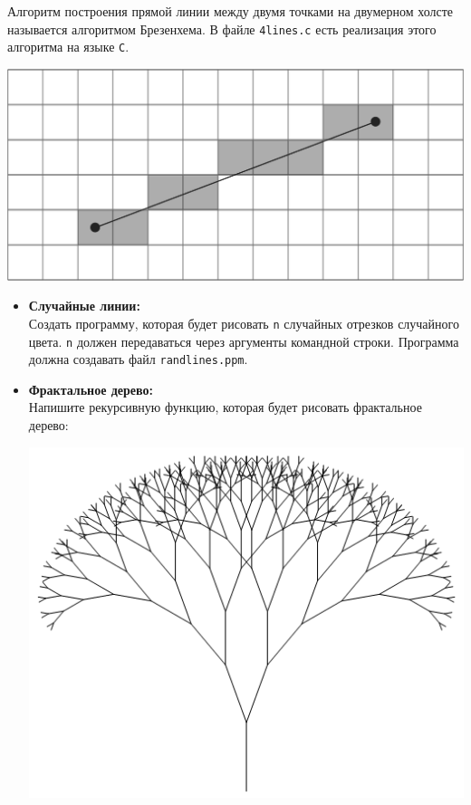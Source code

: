 \documentclass{article}
\begin{document}
Алгоритм построения прямой линии между двумя точками на двумерном холсте называется алгоритмом Брезенхема.
В файле \texttt{4lines.c} есть реализация этого алгоритма на языке \texttt{C}.
\begin{center}
\includegraphics[scale=1]{../images/bresenham.png}
\end{center}

\begin{itemize}
\item \textbf{Случайные линии:}\\
Создать программу, которая будет рисовать \texttt{n} случайных отрезков случайного цвета. \texttt{n} должен передаваться через аргументы командной строки. Программа должна создавать файл \texttt{randlines.ppm}.
\item \textbf{Фрактальное дерево:}\\
Напишите рекурсивную функцию, которая будет рисовать фрактальное дерево:
\begin{center}
\includegraphics[scale=0.4]{../images/treefractal.png}
\end{center}
\end{itemize}
\end{document}
